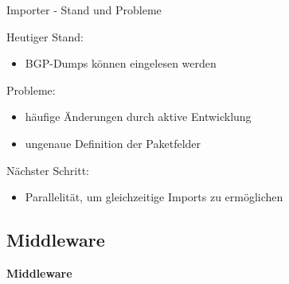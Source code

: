 \documentclass[9pt]{beamer}
\begin{document}
\begin{frame}{Importer - Stand und Probleme}{}

	Heutiger Stand:
	\begin{itemize}
		\item BGP-Dumps können eingelesen werden
	\end{itemize}
	\vspace{0,2cm}
	Probleme:
	\begin{itemize}
		\item  häufige Änderungen durch aktive Entwicklung
		\item ungenaue Definition der Paketfelder
	\end{itemize}
	\vspace{0,2cm}
	Nächster Schritt:
	\begin{itemize}
		\item Parallelität, um gleichzeitige Imports zu ermöglichen
	\end{itemize}

\end{frame}

\subsection{Middleware}

	\begin{frame}{}
		\begin{center}
			\LARGE \textbf{Middleware}
		\end{center}
	\end{frame}
\end{document}
